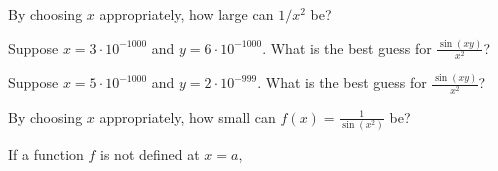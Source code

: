 \documentclass{ximera}
\newcommand{\recommendation}[1]{}
\newcommand{\GoodQuestions}[1]{}
\begin{document}
\begin{problem}
  By choosing $x$ appropriately, how large can $1/x^2$ be?
  \begin{multipleChoice}
  \end{multipleChoice}
\end{problem}

\begin{problem}
  Suppose $x = 3 \cdot 10^{-1000}$ and $y = 6 \cdot 10^{-1000}$.  What is the best guess for $\frac{\sin (xy)}{x^2}$?
  \begin{multipleChoice}
  \end{multipleChoice}
\end{problem}

\begin{problem}

  Suppose $x = 5 \cdot 10^{-1000}$ and $y = 2 \cdot 10^{-999}$.  What is the best guess for $\frac{\sin (xy)}{x^2}$?
  \begin{multipleChoice}
  \end{multipleChoice}
\end{problem}

\begin{problem}
  By choosing $x$ appropriately, how small can $f(x) = \frac{1}{\sin (x^2)}$ be?
  \begin{multipleChoice}
  \end{multipleChoice}
\end{problem}



\begin{problem}
  \recommendation{Vic}
  \GoodQuestions{Subject: Limits, 11Q}
If a function $f$ is not defined at $x=a$,
\begin{multipleChoice}
\end{multipleChoice} 
\end{problem}
\end{document}
